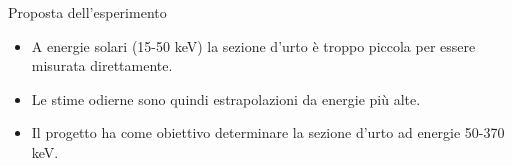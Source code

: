 \documentclass [xcolor=svgnames] {beamer}
\begin{document}
	\begin{frame}{Proposta dell'esperimento}
		\begin{itemize}
			\item A energie solari (15-50 keV) la sezione d'urto è troppo piccola per essere misurata direttamente.
			\item Le stime odierne sono quindi estrapolazioni da energie più alte.
			\item Il progetto ha come obiettivo determinare la sezione d'urto ad energie 50-370 keV.
		\end{itemize}
	\end{frame}
	
%	
%	
%	
%	
%	
\end{document}
